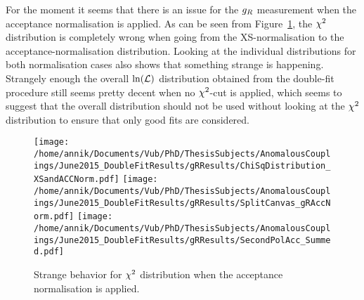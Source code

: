 For the moment it seems that there is an issue for the $g_{R}$ measurement when the acceptance normalisation is applied. As can be seen from Figure~\ref{fig::ChiSqgR}, the $\chi^{2}$ distribution is completely wrong when going from the XS-normalisation to the acceptance-normalisation distribution. Looking at the individual distributions for both normalisation cases also shows that something strange is happening. Strangely enough the overall $\ln(\mathcal{L})$ distribution obtained from the double-fit procedure still seems pretty decent when no $\chi^{2}$-cut is applied, which seems to suggest that the overall distribution should not be used without looking at the $\chi^{2}$ distribution to ensure that only good fits are considered. 
\\
\begin{figure}[h!t]
 \centering
 \texttt{[image: /home/annik/Documents/Vub/PhD/ThesisSubjects/AnomalousCouplings/June2015\_DoubleFitResults/gRResults/ChiSqDistribution\_XSandACCNorm.pdf]}
 \texttt{[image: /home/annik/Documents/Vub/PhD/ThesisSubjects/AnomalousCouplings/June2015\_DoubleFitResults/gRResults/SplitCanvas\_gRAccNorm.pdf]}
 \texttt{[image: /home/annik/Documents/Vub/PhD/ThesisSubjects/AnomalousCouplings/June2015\_DoubleFitResults/gRResults/SecondPolAcc\_Summed.pdf]}
 \caption{Strange behavior for $\chi^{2}$ distribution when the acceptance normalisation is applied.}
 \label{fig::ChiSqgR}
\end{figure}




